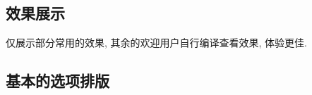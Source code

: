 \documentclass{l3doc}
\begin{document}
\begin{documentation}




\section{效果展示}
仅展示部分常用的效果, 其余的欢迎用户自行编译查看效果, 体验更佳.

\subsection{基本的选项排版}
\lstset{ linewidth = 0.4\linewidth }

\begin{LaTeXautodemo}
\end{LaTeXautodemo}
\begin{LaTeXautodemo}
\end{LaTeXautodemo}


\end{documentation}
\end{document}
